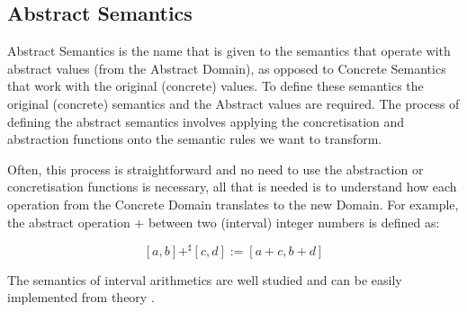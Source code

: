 \subsection{Abstract Semantics}\label{abstract-semantics}


Abstract Semantics is the name that is given to the semantics that operate with abstract
values (from the Abstract Domain), as opposed to Concrete Semantics that work with the
original (concrete) values. To define these semantics the original (concrete) semantics
and the Abstract values are required. The process of defining the abstract semantics
involves applying the concretisation and abstraction functions onto the semantic rules we
want to transform.

Often, this process is straightforward and no need to use the abstraction or
concretisation functions is necessary, all that is needed is to understand how each
operation from the Concrete Domain translates to the new Domain. For example, the
abstract operation \(+\) between two (interval) integer numbers is defined as:

\[[a, b] +^{\sharp} [c, d] := [a+c, b+d]\]

The semantics of interval arithmetics are well studied and can be easily implemented from
theory \autocite{hayes_interval_2003}.


%
%
%
%

